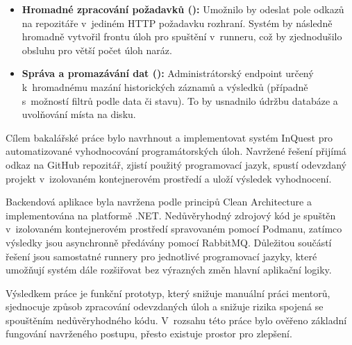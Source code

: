 \documentclass[
  biblatex,
  figures,
  tables,
  glossaries,
  index
]{kidiplom}
\begin{document}
\begin{itemize}
	\begin{itemize}
		\item \textbf{Hromadné zpracování požadavků ():} Umožnilo by odeslat pole odkazů na repozitáře v~jediném HTTP požadavku rozhraní. Systém by následně hromadně vytvořil frontu úloh pro spuštění v~runneru, což by zjednodušilo obsluhu pro větší počet úloh naráz.
		\item \textbf{Správa a promazávání dat ():} Administrátorský endpoint určený k~hromadnému mazání historických záznamů a výsledků (případně s~možností filtrů podle data či stavu). To by usnadnilo údržbu databáze a uvolňování místa na disku.
	\end{itemize}
\end{itemize}

\newpage


\begin{kiconclusions}
Cílem bakalářské práce bylo navrhnout a implementovat systém InQuest pro automatizované vyhodnocování programátorských úloh. Navržené řešení přijímá odkaz na GitHub repozitář, zjistí použitý programovací jazyk, spustí odevzdaný projekt v~izolovaném kontejnerovém prostředí a uloží výsledek vyhodnocení.

Backendová aplikace byla navržena podle principů Clean Architecture a implementována na platformě .NET. Nedůvěryhodný zdrojový kód je spuštěn v~izolovaném kontejnerovém prostředí spravovaném pomocí Podmanu, zatímco výsledky jsou asynchronně předávány pomocí RabbitMQ. Důležitou součástí řešení jsou samostatné runnery pro jednotlivé programovací jazyky, které umožňují systém dále rozšiřovat bez výrazných změn hlavní aplikační logiky.

Výsledkem práce je funkční prototyp, který snižuje manuální práci mentorů, sjednocuje způsob zpracování odevzdaných úloh a snižuje rizika spojená se spouštěním nedůvěryhodného kódu. V~rozsahu této práce bylo ověřeno základní fungování navrženého postupu, přesto existuje prostor pro zlepšení.
\end{kiconclusions}
\end{document}
